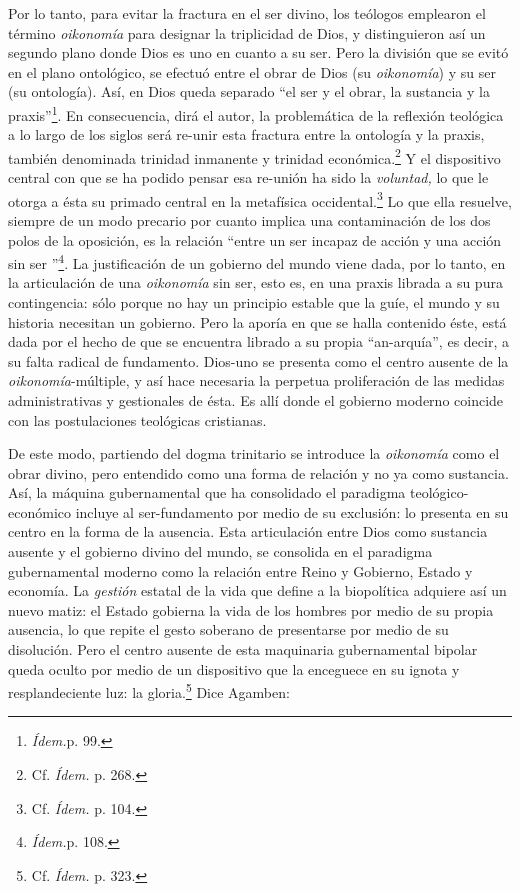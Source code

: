 Por lo tanto, para evitar la fractura en el ser divino, los teólogos emplearon el término \emph{oikonomía} para designar la triplicidad de Dios, y distinguieron así un segundo plano donde Dios es uno en cuanto a su ser. Pero la división que se evitó en el plano ontológico, se efectuó entre el obrar de Dios (su \emph{oikonomía}) y su ser (su ontología). Así, en Dios queda separado \enquote{el ser y el obrar, la sustancia y la praxis}\footnote{\emph{Ídem.}p. 99.}. En consecuencia, dirá el autor, la problemática de la reflexión teológica a lo largo de los siglos será re-unir esta fractura entre la ontología y la praxis, también denominada trinidad inmanente y trinidad económica.\footnote{Cf. \emph{Ídem.} p. 268.} Y el dispositivo central con que se ha podido pensar esa re-unión ha sido la \emph{voluntad,} lo que le otorga a ésta su primado central en la metafísica occidental.\footnote{Cf. \emph{Ídem.} p. 104.} Lo que ella resuelve, siempre de un modo precario por cuanto implica una contaminación de los dos polos de la oposición, es la relación \enquote{entre un ser incapaz de acción y una acción sin ser }\footnote{\emph{Ídem.}p. 108.}. La justificación de un gobierno del mundo viene dada, por lo tanto, en la articulación de una \emph{oikonomía} sin ser, esto es, en una praxis librada a su pura contingencia: sólo porque no hay un principio estable que la guíe, el mundo y su historia necesitan un gobierno. Pero la aporía en que se halla contenido éste, está dada por el hecho de que se encuentra librado a su propia \enquote{an-arquía}, es decir, a su falta radical de fundamento. Dios-uno se presenta como el centro ausente de la \emph{oikonomía}-múltiple, y así hace necesaria la perpetua proliferación de las medidas administrativas y gestionales de ésta. Es allí donde el gobierno moderno coincide con las postulaciones teológicas cristianas.

De este modo, partiendo del dogma trinitario se introduce la \emph{oikonomía} como el obrar divino, pero entendido como una forma de relación y no ya como sustancia. Así, la máquina gubernamental que ha consolidado el paradigma teológico-económico incluye al ser-fundamento por medio de su exclusión: lo presenta en su centro en la forma de la ausencia. Esta articulación entre Dios como sustancia ausente y el gobierno divino del mundo, se consolida en el paradigma gubernamental moderno como la relación entre Reino y Gobierno, Estado y economía. La \emph{gestión} estatal de la vida que define a la biopolítica adquiere así un nuevo matiz: el Estado gobierna la vida de los hombres por medio de su propia ausencia, lo que repite el gesto soberano de presentarse por medio de su disolución. Pero el centro ausente de esta maquinaria gubernamental bipolar queda oculto por medio de un dispositivo que la enceguece en su ignota y resplandeciente luz: la gloria.\footnote{Cf. \emph{Ídem.} p. 323.} Dice Agamben:

